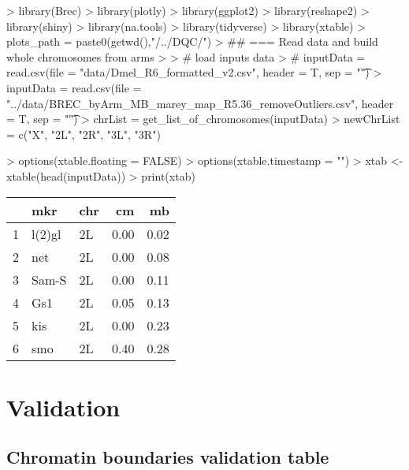 \documentclass{article}
\begin{document}


\begin{Schunk}
\begin{Sinput}
> library(Brec)
> library(plotly)
> library(ggplot2)
> library(reshape2)
> library(shiny)
> library(na.tools)
> library(tidyverse)
> library(xtable)
> plots_path =  paste0(getwd(),"/../DQC/")
> ## === Read data and build whole chromosomes from arms
> 
> # load inputs data
> # inputData = read.csv(file = "data/Dmel_R6_formatted_v2.csv", header = T, sep = "\t")
> inputData = read.csv(file = "../data/BREC_byArm_MB_marey_map_R5.36_removeOutliers.csv", header = T, sep = "\t")
> chrList = get_list_of_chromosomes(inputData)
> newChrList = c("X", "2L", "2R", "3L", "3R")
\end{Sinput}
\end{Schunk}

\begin{Schunk}
\begin{Sinput}
> options(xtable.floating = FALSE)
> options(xtable.timestamp = "")
> xtab <- xtable(head(inputData))
> print(xtab)
\end{Sinput}
\begin{Soutput}
% latex table generated in R 3.5.2 by xtable 1.8-4 package
% 
\begin{tabular}{rllrr}
  \hline
 & mkr & chr & cm & mb \\ 
  \hline
1 & l(2)gl & 2L & 0.00 & 0.02 \\ 
  2 & net & 2L & 0.00 & 0.08 \\ 
  3 & Sam-S & 2L & 0.00 & 0.11 \\ 
  4 & Gs1 & 2L & 0.05 & 0.13 \\ 
  5 & kis & 2L & 0.00 & 0.23 \\ 
  6 & smo & 2L & 0.40 & 0.28 \\ 
   \hline
\end{tabular}
\end{Soutput}
\end{Schunk}

\section{Validation}

\subsection{Chromatin boundaries validation table}
\end{document}
